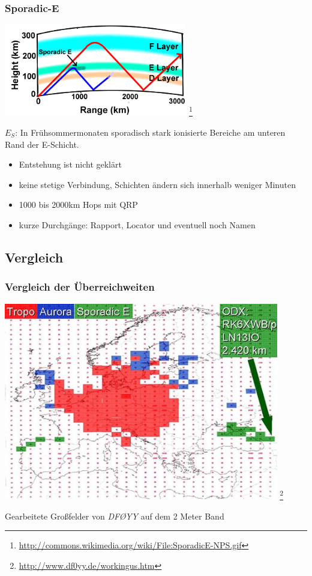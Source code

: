 \begin{frame}
    \frametitle{Sporadic-E}

    \begin{center}
        \includegraphics[width=0.6\textwidth]{bv11/SporadicE-NPS.png}
        \footnote{\tiny \url{http://commons.wikimedia.org/wiki/File:SporadicE-NPS.gif}}
    \end{center}

    $E_S$: In Frühsommermonaten sporadisch stark ionisierte Bereiche am unteren Rand
    der E-Schicht.

    \begin{itemize}
        \item Entstehung ist nicht geklärt
        \item keine stetige Verbindung, Schichten ändern sich innerhalb weniger Minuten
        \item 1000 bis 2000km Hops mit QRP
        \item kurze Durchgänge: Rapport, Locator und eventuell noch Namen
    \end{itemize}

\end{frame}

\subsection{Vergleich}

\begin{frame}
    \frametitle{Vergleich der Überreichweiten}

    \begin{center}
        \includegraphics[width=0.9\textwidth]{bv11/df0yy_2m-karte.jpg}
        \footnote{\tiny \url{http://www.df0yy.de/workingus.htm}}

        Gearbeitete Großfelder von \emph{DFØYY} auf dem 2 Meter Band
    \end{center}

\end{frame}

